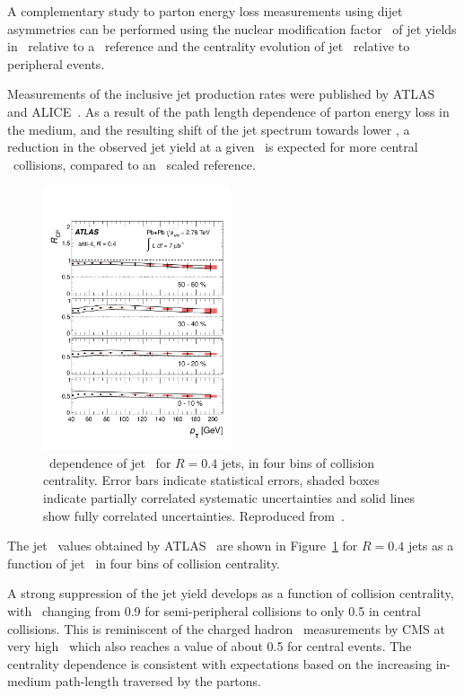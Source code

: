 A complementary study to parton energy loss measurements using dijet asymmetries
can be performed using the nuclear modification factor \Raa\ of jet yields in \PbPb\ relative
to a \pp\ reference and the centrality evolution of jet \Rcp\ relative to peripheral events.

Measurements of the inclusive jet production rates were published by ATLAS~\cite{Aad:2012is} and 
ALICE~\cite{Abelev:2013kqa}.
As a result of the path length dependence of parton energy loss in the medium, and 
the resulting shift of the jet spectrum towards lower \pT,
a reduction in the observed jet yield at a given \pT\ is expected for more 
central \PbPb\ collisions, compared to an \Ncoll\ scaled reference.

\begin{figure}[!th]
\begin{center}
\includegraphics[width=0.49\textwidth]{jetfigures/ATLAS_jetRCP_04.pdf}
\caption{
\pT\ dependence of jet \Rcp\ for  $R=0.4$ jets,
in four bins of collision centrality. Error bars indicate
statistical errors,  shaded boxes indicate partially 
correlated systematic uncertainties and
solid lines show fully correlated uncertainties. Reproduced from~\cite{Aad:2012is}.}
\label{fig:GR:rcprfour}
\end{center}
\end{figure}
The jet \Rcp\ values obtained by ATLAS~\cite{Aad:2012is} are shown in Figure~\ref{fig:GR:rcprfour}
for $R=0.4$ jets as a function of jet \pT\ in four bins of collision centrality.

A strong suppression of the jet yield develops as a function
of collision centrality, with \Rcp\ changing from 0.9 for semi-peripheral
collisions to only 0.5 in central collisions.  This is reminiscent
of the charged hadron \Raa\ measurements by CMS at very high \pT\, which 
also reaches a value of about 0.5 for central events.
The centrality dependence is consistent with expectations based on the increasing 
in-medium path-length traversed by the partons. 

